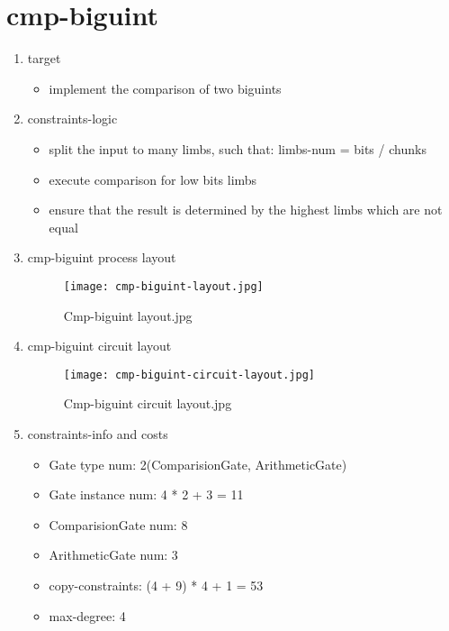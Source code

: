 \section{cmp-biguint}
\label{cmp-biguint}

\begin{enumerate}
    \item target
        \begin{itemize}
            \item implement the comparison of two biguints
        \end{itemize}
    \item constraints-logic
        \begin{itemize}
            \item split the input to many limbs, such that: limbs-num = bits / chunks
            \item execute comparison for low bits limbs
            \item ensure that the result is determined by the highest limbs which are not equal
        \end{itemize}
    \item cmp-biguint process layout
        \begin{figure}[!ht]
            \centering
            \texttt{[image: cmp-biguint-layout.jpg]}
            \caption{Cmp-biguint layout.jpg}
            \label{fig:cmp-biguint-layout.jpg}
        \end{figure}
    \item cmp-biguint circuit layout
    \begin{figure}[!ht]
        \centering
        \texttt{[image: cmp-biguint-circuit-layout.jpg]}
        \caption{Cmp-biguint circuit layout.jpg}
        \label{fig:cmp-biguint-circuit-layout.jpg}
    \end{figure}
    
    \item constraints-info and costs
        \begin{itemize}
            \item Gate type num: 2(ComparisionGate, ArithmeticGate)
            \item Gate instance num: 4 * 2 + 3 = 11 
            \item ComparisionGate num: 8
            \item ArithmeticGate num: 3
            \item copy-constraints: (4 + 9) * 4 + 1 = 53 
            \item max-degree: 4
        \end{itemize}

\end{enumerate}